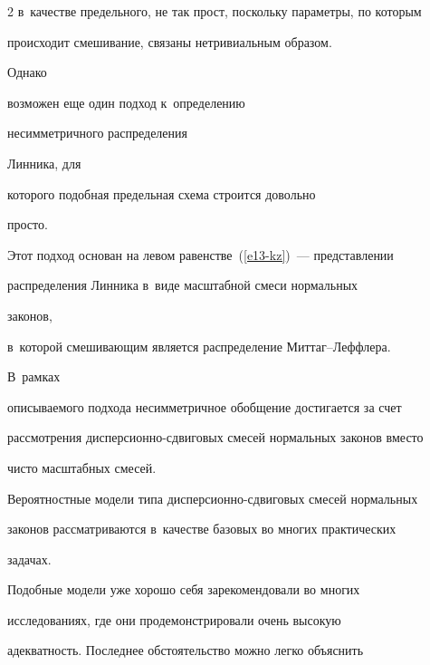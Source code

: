 \begin{multicols}{2}
в~качестве предельного, не так прост, поскольку параметры, по которым


происходит смешивание, связаны нетривиальным образом. 


{





}





Однако


возможен еще один подход к~определению %


несимметричного распределения


Линника, для %


которого подобная предельная схема строится довольно


просто. 


%


Этот подход основан на левом равенстве~(\ref{e13-kz})~--- представлении


распределения Линника в~виде масштабной смеси нормальных %


 законов, 


в~которой смешивающим является распределение Мит\-таг--Леф\-фле\-ра. 





В~рамках


описываемого подхода несимметричное обобщение достигается за счет


рассмотрения дис\-пер\-си\-он\-но-сдви\-го\-вых смесей нормальных законов вместо


чисто масштабных смесей.





Вероятностные модели типа дис\-пер\-си\-он\-но-сдви\-го\-вых смесей нормальных


законов рассматриваются в~качестве базовых во многих практических


задачах. 





Подобные модели уже хорошо себя зарекомендовали во многих


исследованиях, где они продемонстрировали очень высокую


адекватность. Последнее обстоятельство можно легко объяснить\linebreak



\end{multicols}
